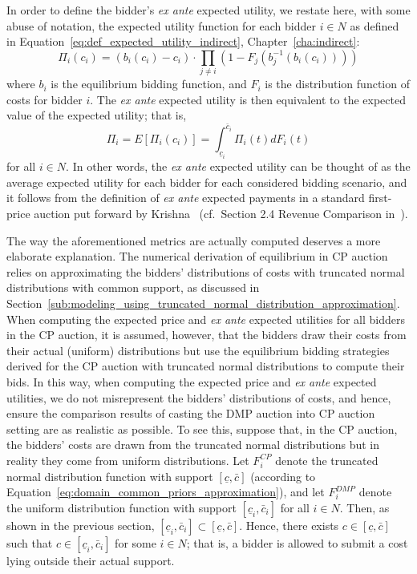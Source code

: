 In order to define the bidder's \emph{ex ante} expected utility, we restate here, with some abuse of notation, the expected utility function for each bidder $i\in N$ as defined in Equation~\eqref{eq:def_expected_utility_indirect}, Chapter~\ref{cha:indirect}:
\begin{equation}
  \label{eq:expected_utility_approximation}
  \Pi_i(c_i) = (b_i(c_i) - c_i)\cdot \prod_{j\neq i} \left( 1 - F_j(b_j^{-1}(b_i(c_i))) \right)
\end{equation}
where $b_i$ is the equilibrium bidding function, and $F_i$ is the distribution function of costs for bidder $i$. The \emph{ex ante} expected utility is then equivalent to the expected value of the expected utility; that is,
\begin{equation}
  \label{eq:ex_ante_expected_utility_approximation}
  \Pi_i = E[\Pi_i(c_i)] = \int_{\underline{c}_i}^{\bar{c}_i} \Pi_i(t)dF_i(t)
\end{equation}
for all $i\in N$. In other words, the \emph{ex ante} expected utility can be thought of as the average expected utility for each bidder for each considered bidding scenario, and it follows from the definition of \emph{ex ante} expected payments in a standard first-price auction put forward by Krishna~\cite{Krishna10} (cf.~Section 2.4 Revenue Comparison in~\cite{Krishna10}).

The way the aforementioned metrics are actually computed deserves a more elaborate explanation. The numerical derivation of equilibrium in CP auction relies on approximating the bidders' distributions of costs with truncated normal distributions with common support, as discussed in Section~\ref{sub:modeling_using_truncated_normal_distribution_approximation}. When computing the expected price and \emph{ex ante} expected utilities for all bidders in the CP auction, it is assumed, however, that the bidders draw their costs from their actual (uniform) distributions but use the equilibrium bidding strategies derived for the CP auction with truncated normal distributions to compute their bids. In this way, when computing the expected price and \emph{ex ante} expected utilities, we do not misrepresent the bidders' distributions of costs, and hence, ensure the comparison results of casting the DMP auction into CP auction setting are as realistic as possible. To see this, suppose that, in the CP auction, the bidders' costs are drawn from the truncated normal distributions but in reality they come from uniform distributions. Let $F_i^{CP}$ denote the truncated normal distribution function with support $[\underline{c}, \bar{c}]$ (according to Equation~\eqref{eq:domain_common_priors_approximation}), and let $F_i^{DMP}$ denote the uniform distribution function with support $[\underline{c}_i, \bar{c}_i]$ for all $i\in N$. Then, as shown in the previous section, $[\underline{c}_i,\bar{c}_i]\subset [\underline{c}, \bar{c}]$. Hence, there exists $c\in [\underline{c}, \bar{c}]$ such that $c\in [\underline{c}_i, \bar{c}_i]$ for some $i\in N$; that is, a bidder is allowed to submit a cost lying outside their actual support.

